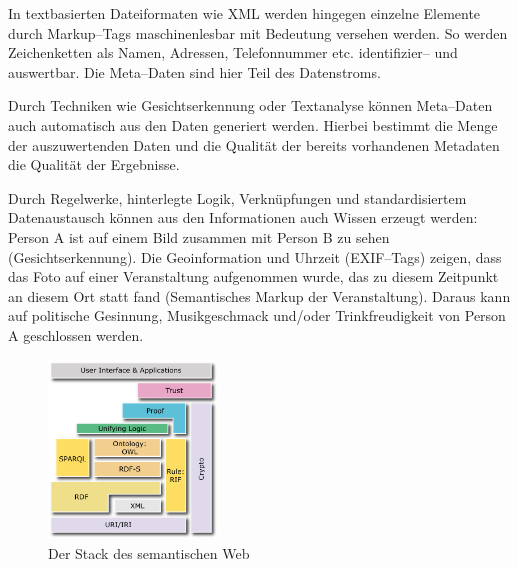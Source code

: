 In textbasierten Dateiformaten wie XML werden hingegen einzelne Elemente durch Markup--Tags maschinenlesbar mit Bedeutung versehen werden. So werden Zeichenketten als Namen, Adressen, Telefonnummer etc. identifizier-- und auswertbar. Die Meta--Daten sind hier Teil des Datenstroms.

Durch Techniken wie Gesichtserkennung oder Textanalyse können Meta--Daten auch automatisch aus den Daten generiert werden. Hierbei bestimmt die Menge der auszuwertenden Daten und die Qualität der bereits vorhandenen Metadaten die Qualität der Ergebnisse.

Durch Regelwerke, hinterlegte Logik, Verknüpfungen und standardisiertem Datenaustausch können aus den Informationen auch Wissen erzeugt werden:
Person A ist auf einem Bild zusammen mit Person B zu sehen (Gesichtserkennung). Die Geoinformation und Uhrzeit (EXIF--Tags) zeigen, dass das Foto auf einer Veranstaltung aufgenommen wurde, das zu diesem Zeitpunkt an diesem Ort statt fand (Semantisches Markup der Veranstaltung).
Daraus kann auf politische Gesinnung, Musikgeschmack und/oder Trinkfreudigkeit von Person A geschlossen werden.

\begin{figure}[H]
\begin{center}
\includegraphics[width=0.4\textwidth]{layerCake-4.png}
\caption{Der Stack des semantischen Web}
\label{pic:tsemanticstack}
\end{center}
\end{figure}